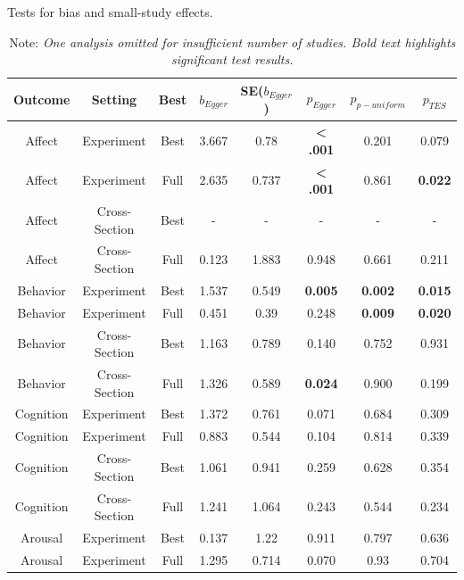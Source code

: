 \documentclass[jou]{apa6}
\begin{document}
\begin{table}[htbp]
	\centering
	\caption{Tests for bias and small-study effects.}
	\begin{tabular}{cccccccc}
		\toprule
		Outcome & Setting & Best  & $b_{Egger}$ & SE($b_{Egger}$) & $p_{Egger}$ & $p_{p-uniform}$ & $p_{TES}$ \\
		\midrule
		Affect & Experiment & Best  & 3.667 & 0.78  & \textbf{< .001} & 0.201 & 0.079 \\
		Affect & Experiment & Full  & 2.635 & 0.737 & \textbf{< .001} & 0.861 & \textbf{0.022} \\
		Affect & Cross-Section & Best  & -     & -     & -     & -     & - \\
		Affect & Cross-Section & Full  & 0.123 & 1.883 & 0.948 & 0.661 & 0.211 \\
		Behavior & Experiment & Best  & 1.537 & 0.549 & \textbf{0.005} & \textbf{0.002} & \textbf{0.015} \\
		Behavior & Experiment & Full  & 0.451 & 0.39  & 0.248 & \textbf{0.009} & \textbf{0.020} \\
		Behavior & Cross-Section & Best  & 1.163 & 0.789 & 0.140  & 0.752 & 0.931 \\
		Behavior & Cross-Section & Full  & 1.326 & 0.589 & \textbf{0.024} & 0.900   & 0.199 \\
		Cognition & Experiment & Best  & 1.372 & 0.761 & 0.071 & 0.684 & 0.309 \\
		Cognition & Experiment & Full  & 0.883 & 0.544 & 0.104 & 0.814 & 0.339 \\
		Cognition & Cross-Section & Best  & 1.061 & 0.941 & 0.259 & 0.628 & 0.354 \\
		Cognition & Cross-Section & Full  & 1.241 & 1.064 & 0.243 & 0.544 & 0.234 \\
		Arousal & Experiment & Best  & 0.137 & 1.22  & 0.911 & 0.797 & 0.636 \\
		Arousal & Experiment & Full  & 1.295 & 0.714 & 0.070  & 0.93  & 0.704 \\
		\bottomrule
	\end{tabular}%
	\label{table:Egger}%
	\caption*{Note: {\em One analysis omitted for insufficient number of studies. Bold text highlights significant test results.
			}}
\end{table}%
\end{document}
